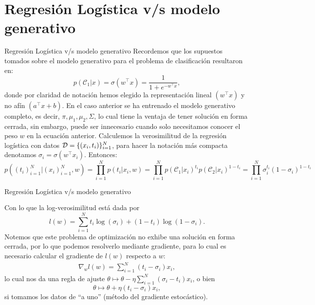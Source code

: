 \documentclass[9pt, handout]{beamer}
\begin{document}
\section{Regresión Logística v/s modelo generativo}
\begin{frame}{Regresión Logística v/s modelo generativo}
Recordemos que los supuestos tomados sobre el modelo generativo para el problema de clasificación resultaron en:
\begin{equation*}
p(\mathcal{C}_1|x) = \sigma(w^\top x) = \frac{1}{1+e^{-w^\top x}},
\end{equation*}
donde por claridad de notación hemos elegido la representación lineal $(w^\top x)$ y no afín $(a^\top x + b)$. \pause
En el caso anterior se ha entrenado el modelo generativo completo, es decir, $\pi, \mu_1,\mu_2, \Sigma$, lo cual tiene la ventaja de tener solución en forma cerrada, sin embargo, puede ser innecesario cuando solo necesitamos conocer el peso $w$ en la ecuación anterior. \pause
Calculemos la verosimilitud de la regresión logística con datos ${\mathcal D}=\{(x_i,t_i)\}_{i=1}^N$, para hacer la notación más compacta denotamos $\sigma_i = \sigma(w^\top x_i)$. Entonces:
\begin{equation*}
p((t_i)_{i=1}^N|(x_i)_{i=1}^N,w) = \prod_{i=1}^{N}p(t_i|x_i,w)= \prod_{i=1}^{N} p(\mathcal{C}_1|x_i)^{t_i} p(\mathcal{C}_2|x_i)^{1-t_i} =  \prod_{i=1}^{N}\sigma_i^{t_i}(1-\sigma_i)^{1-t_i} 
\end{equation*}
\end{frame}
\begin{frame}{Regresión Logística v/s modelo generativo}

Con lo que la log-verosimilitud está dada por
\begin{equation*}
  l(w) = \sum_{i=1}^N t_i\log(\sigma_i) + (1-t_i)\log(1-\sigma_i).
\end{equation*} \pause 
Notemos que este  problema de optimización no exhibe una solución en forma cerrada, por lo que podemos resolverlo mediante gradiente, para lo cual es necesario calcular el gradiente de $l(w)$ respecto a $w$:
\begin{align*}
\nabla_w l(w) = \sum_{i=1}^N (t_i-\sigma_i)x_i,
\end{align*} \pause
lo cual nos da una regla de  ajuste $\theta \mapsto \theta - \eta \sum_{i=1}^N (\sigma_i-t_i)x_i$, o bien 
\begin{equation*}
  \theta \mapsto \theta + \eta(t_i-\sigma_i)x_i, \label{eq:reg_log_theta_update}
\end{equation*}
si tomamos los  datos de ``a uno'' (método del gradiente estocástico).


\end{frame}
\end{document}
